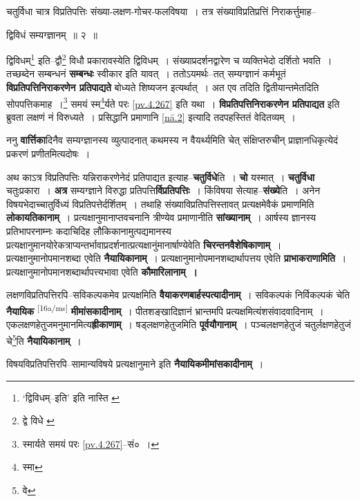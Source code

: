\documentclass[article,12pt,a4paper]{memoir}
\begin{document}
	चतुर्विधा चात्र विप्रतिपत्तिः संख्या-लक्षण-गोचर-फलविषया । तत्र संख्याविप्रतिप्रत्तिं निराकर्त्तुमाह-- 
	  
	द्विविधं सम्यग्ज्ञानम् ॥ २ ॥ 
	  
	द्विविधम्\footnote{‘द्विविधम्--इति’ इति नास्ति \cite{dp-edH}} इति--द्वौ\footnote{द्वे विधे \cite{dp-msB}} विधौ प्रकारावस्येति द्विविधम् । संख्याप्रदर्शनद्वारेण च व्यक्तिभेदो दर्शितो भवति । तच्छब्देन सम्बन्धनं \textbf{सम्बन्धः} स्वीकार इति यावत् । ततोऽयमर्थः--तत् सम्यग्ज्ञानं कर्मभूतं \textbf{विप्रतिपत्तिनिराकरणेन प्रतिपाद्यते} बोध्यते शिष्यजन इत्यर्थात् । अत एव तदिति द्वितीयान्तमेतदिति सोपपत्तिकमाह ।\footnote{स्मार्यते समयं परः \cref{pv.4.267}--सं० ।} समयं स्म\footnote{स्मा}र्यते परः \cref{pv.4.267} इति यथा । \textbf{विप्रतिपत्तिनिराकरणेन प्रतिपाद्यत} इति ब्रुवता लक्षणं नं विरुध्यते । प्रसिद्धानि प्रमाणानि \cref{nā.2} इत्यादि तदपहस्तितं वेदितव्यम् ।
	\pend
      

	  \pstart ननु \textbf{वार्त्तिका}दिनैव सम्यग्ज्ञानस्य व्युत्पादनात् कथमस्य न वैयर्थ्यमिति चेत् संक्षिप्तरुचीन् प्राज्ञानधिकृत्येदं प्रकरणं प्रणीतमित्यदोषः ।
	\pend
      

	  \pstart अथ काऽत्र विप्रतिपत्तिः यन्निराकरणेनेदं प्रतिपाद्यत इत्याह--\textbf{चतुर्विधे}ति । \textbf{चो} यस्मात् । \textbf{चतुर्विधा} चतुःप्रकारा । \textbf{अत्र} सम्यग्ज्ञाने विरुद्धा प्रतिपत्ति\textbf{र्विप्रतिपत्तिः} । किंविषया सेत्याह--\textbf{संख्ये}ति । अनेन विषयभेदाच्चातुर्विध्यं विप्रतिपत्तेर्दर्शितम् । तथाहि संख्याविप्रतिपत्तिस्तावत् प्रत्यक्षमेवैकं प्रमाणमिति \textbf{लोकायतिकानाम्} । प्रत्यक्षानुमानाप्तवचनानि त्रीण्येव प्रमाणानीति \textbf{सांख्यानाम्} । आर्षस्य ज्ञानस्य प्रतिभापरनाम्नः कदाचिदिह लौकिकानामुत्पद्यमानस्य प्रत्यक्षानुमानयोरेकत्राप्यन्तर्भावाप्रदर्शनात्प्रत्यक्षानुंमानार्षाण्येवेति \textbf{चिरन्तनवैशेषिकाणाम्} । प्रत्यक्षानुमानोपमानशब्दा एवेति \textbf{नैयायिकानाम्} । प्रत्यक्षानुमानोपमानशब्दार्थापत्तय एवेति \textbf{प्राभाकराणामिति} । प्रत्यक्षानुमानोपमानशब्दार्थापत्त्यभावा एवेति \textbf{कौमारिलानाम् ।}
	\pend
      

	  \pstart लक्षणविप्रतिपत्तिरपि--सविकल्पकमेव प्रत्यक्षमिति \textbf{वैयाकरणबार्हस्पत्यादीनाम्} । सविकल्पकं निर्विकल्पकं चेति \textbf{नैयायिक} \leavevmode\textsuperscript{\rmlatinfont\tiny [16a/ms]} \textbf{मीमांसकादीनाम्} । पीतशङ्खादिज्ञानं भ्रान्तमपि प्रत्यक्षमित्यंशसंवादवादिनाम् । एकलक्षणहेतुजमनुमानमित्य\textbf{ह्रीकाणाम्} । षड्लक्षणहेतुजमिति \textbf{पूर्वयौगानाम्} । पञ्चलक्षणहेतुजं चतुर्लक्षणहेतुजं चे\footnote{वे}ति \textbf{नैयायिकानाम्} ।
	\pend
      

	  \pstart विषयविप्रतिपत्तिरपि--सामान्यविषये प्रत्यक्षानुमाने इति \textbf{नैयायिकमीमांसकादीनाम्} ।
	\pend
      
\end{document}
